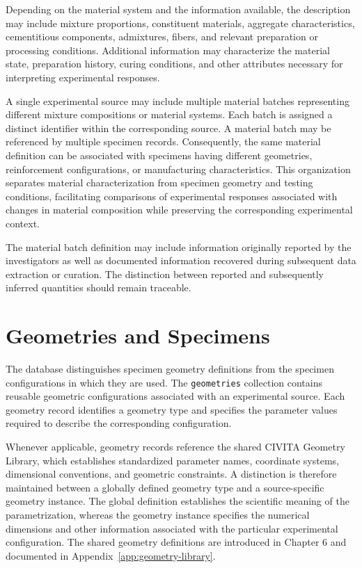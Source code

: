 Depending on the material system and the
information available, the description may
include mixture proportions, constituent
materials, aggregate characteristics,
cementitious components, admixtures,
fibers, and relevant preparation or
processing conditions.
Additional information may characterize
the material state, preparation history,
curing conditions, and other attributes
necessary for interpreting experimental
responses.

A single experimental source may include
multiple material batches representing
different mixture compositions or material
systems. Each batch is assigned a distinct
identifier within the corresponding source.
A material batch may be referenced by
multiple specimen records. Consequently,
the same material definition can be
associated with specimens having different
geometries, reinforcement configurations,
or manufacturing characteristics.
This organization separates material
characterization from specimen geometry
and testing conditions, facilitating
comparisons of experimental responses
associated with changes in material
composition while preserving the
corresponding experimental context.

The material batch definition may include
information originally reported by the
investigators as well as documented
information recovered during subsequent
data extraction or curation. The distinction
between reported and subsequently inferred
quantities should remain traceable.


\section{Geometries and Specimens}

The database distinguishes specimen geometry
definitions from the specimen configurations
in which they are used.
The \texttt{geometries} collection contains
reusable geometric configurations associated
with an experimental source.
Each geometry record identifies a geometry
type and specifies the parameter values
required to describe the corresponding
configuration.

Whenever applicable, geometry records
reference the shared CIVITA Geometry Library,
which establishes standardized parameter
names, coordinate systems, dimensional
conventions, and geometric constraints.
A distinction is therefore maintained
between a globally defined geometry type
and a source-specific geometry instance.
The global definition establishes the
scientific meaning of the parametrization,
whereas the geometry instance specifies
the numerical dimensions and other
information associated with the particular
experimental configuration.
The shared geometry definitions are
introduced in Chapter 6 and documented
in Appendix~\ref{app:geometry-library}.

